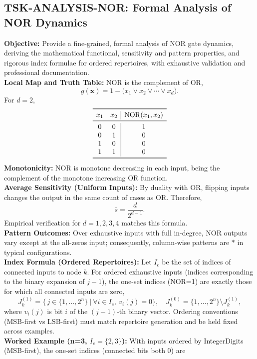 \documentclass{article}
\begin{document}
\subsection{TSK-ANALYSIS-NOR: Formal Analysis of NOR Dynamics}
\textbf{Objective:} Provide a fine-grained, formal analysis of NOR gate dynamics, deriving the mathematical functional, sensitivity and pattern properties, and rigorous index formulae for ordered repertoires, with exhaustive validation and professional documentation.\\
\textbf{Local Map and Truth Table:} NOR is the complement of OR,
\[
g(\mathbf{x}) = 1 - \big( x_1 \lor x_2 \lor \cdots \lor x_d \big).
\]
For \(d=2\),
\[
\begin{array}{cc|c}
\toprule
 x_1 & x_2 & \mathrm{NOR}(x_1,x_2) \\
\midrule
 0 & 0 & 1 \\
 0 & 1 & 0 \\
 1 & 0 & 0 \\
 1 & 1 & 0 \\
\bottomrule
\end{array}
\]
\textbf{Monotonicity:} NOR is monotone decreasing in each input, being the complement of the monotone increasing OR function.\\
\textbf{Average Sensitivity (Uniform Inputs):} By duality with OR, flipping inputs changes the output in the same count of cases as OR. Therefore,
\[
\bar{s} = \frac{d}{2^{d-1}}.
\]
Empirical verification for \(d=1,2,3,4\) matches this formula.\\
\textbf{Pattern Outcomes:} Over exhaustive inputs with full in-degree, NOR outputs vary except at the all-zeros input; consequently, column-wise patterns are \(*\) in typical configurations.\\
\textbf{Index Formula (Ordered Repertoires):} Let \(I_c\) be the set of indices of connected inputs to node \(k\). For ordered exhaustive inputs (indices corresponding to the binary expansion of \(j-1\)), the one-set indices (NOR=1) are exactly those for which all connected inputs are zero,
\[
J_k^{(1)} = \big\{\, j \in \{1,\dots,2^n\} \ \big|\ \forall i \in I_c,\ v_i(j) = 0 \big\},\quad J_k^{(0)} = \{1,\dots,2^n\} \setminus J_k^{(1)},
\]
where \(v_i(j)\) is bit \(i\) of the \((j-1)\)-th binary vector. Ordering conventions (MSB-first vs LSB-first) must match repertoire generation and be held fixed across examples.\\
\textbf{Worked Example (n=3, \(I_c=\{2,3\}\)):} With inputs ordered by IntegerDigits (MSB-first), the one-set indices (connected bits both 0) are
\end{document}
